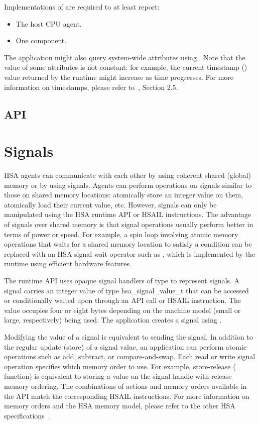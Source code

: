 \documentclass[final]{book}
\newcommand{\reftyp}[1]{#1}
\begin{document}
Implementations of  are required to at least report:
\begin{itemize}[itemsep=1pt,topsep=3pt,partopsep=0pt]
\item The host CPU agent.
\item One component.
\end{itemize}

The application might also query system-wide attributes using
. Note that the value of some attributes is not
constant: for example, the current timestamp
() value returned by the runtime might
increase as time progresses. For more information on timestamps, please refer
to~\cite{sar}, Section 2.5.

\subsection{API}


\section{Signals}\label{sec:signals}

HSA agents can communicate with each other by using coherent shared (global)
memory or by using signals. Agents can perform operations on signals similar to
those on shared memory locations: atomically store an integer value on them,
atomically load their current value, etc. However, signals can only be
manipulated using the HSA runtime API or HSAIL instructions. The advantage of
signals over shared memory is that signal operations usually perform better in
terms of power or speed. For example, a spin loop involving atomic memory
operations that waits for a shared memory location to satisfy a condition can be
replaced with an HSA signal wait operator such as
, which is implemented by the runtime using
efficient hardware features.

The runtime API uses opaque signal handlers of type  to
represent signals. A signal carries an integer value of type
\reftyp{hsa_signal_value_t} that can be accessed or conditionally waited upon
through an API call or HSAIL instruction. The value occupies four or eight bytes
depending on the machine model (small or large, respectively) being used. The
application creates a signal using .

Modifying the value of a signal is equivalent to sending the signal. In addition
to the regular update (store) of a signal value, an application can perform
atomic operations such as add, subtract, or compare-and-swap. Each read or write
signal operation specifies which memory order to use. For example, store-release
( function) is equivalent to storing a value on
the signal handle with release memory ordering. The combinations of actions and
memory orders available in the API match the corresponding HSAIL
instructions. For more information on memory orders and the HSA memory model,
please refer to the other HSA specifications~\cite{prm, sar}.
\end{document}
